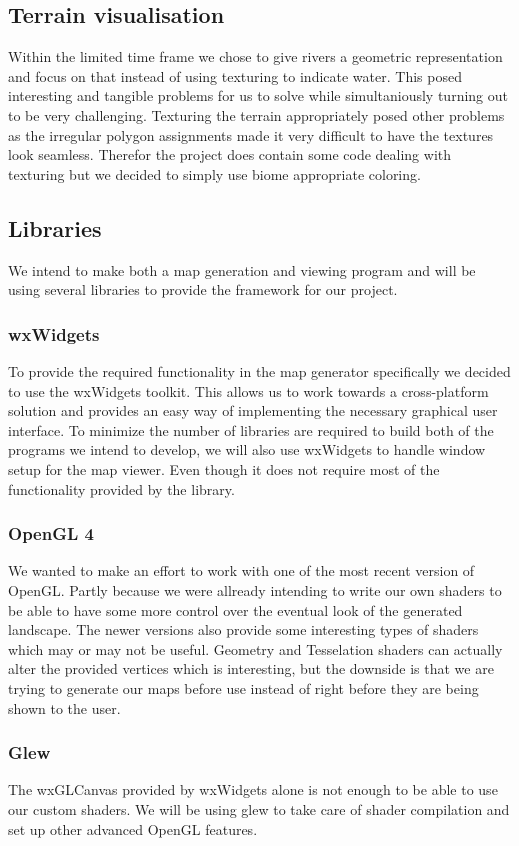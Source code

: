 
\subsection{Terrain visualisation}
Within the limited time frame we chose to give rivers a geometric representation and focus on that instead of using texturing to indicate water. This posed interesting and tangible problems for us to solve while simultaniously turning out to be very challenging. Texturing the terrain appropriately posed other problems as the irregular polygon assignments made it very difficult to have the textures look seamless. Therefor the project does contain some code dealing with texturing but we decided to simply use biome appropriate coloring.

\subsection{Libraries}
We intend to make both a map generation and viewing program and will be using several libraries to provide the framework for our project.

\subsubsection{wxWidgets}
To provide the required functionality in the map generator specifically we decided to use the wxWidgets toolkit. This allows us to work towards a cross-platform solution and provides an easy way of implementing the necessary graphical user interface. To minimize the number of libraries are required to build both of the programs we intend to develop, we will also use wxWidgets to handle window setup for the map viewer. Even though it does not require most of the functionality provided by the library.

\subsubsection{OpenGL 4}
We wanted to make an effort to work with one of the most recent version of OpenGL. Partly because we were allready intending to write our own shaders to be able to have some more control over the eventual look of the generated landscape. The newer versions also provide some interesting types of shaders which may or may not be useful. Geometry and Tesselation shaders can actually alter the provided vertices which is interesting, but the downside is that we are trying to generate our maps before use instead of right before they are being shown to the user.

\subsubsection{Glew}
The wxGLCanvas provided by wxWidgets alone is not enough to be able to use our custom shaders. We will be using glew to take care of shader compilation and set up other advanced OpenGL features.